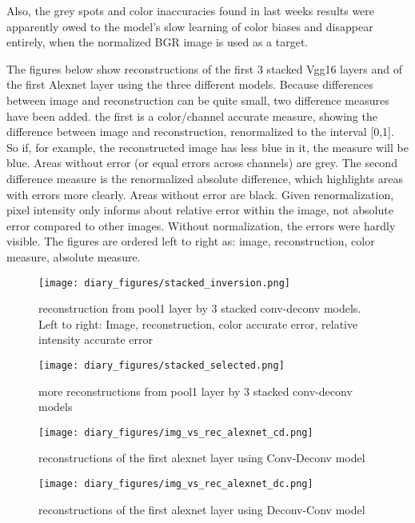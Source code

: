 \documentclass{article}
\begin{document}
Also, the grey spots and color inaccuracies found in last weeks results were apparently owed to the model's slow learning of color biases and disappear entirely, when the normalized BGR image is used as a target.

The figures below show reconstructions of the first 3 stacked Vgg16 layers and of the first Alexnet layer using the three different models. Because differences between image and reconstruction can be quite small, two difference measures have been added. the first is a color/channel accurate measure, showing the difference between image and reconstruction, renormalized to the interval [0,1]. So if, for example, the reconstructed image has less blue in it, the measure will be blue. Areas without error (or equal errors across channels) are grey. The second difference measure is the renormalized absolute difference, which highlights areas with errors more clearly. Areas without error are black. Given renormalization,  pixel intensity only informs about relative error within the image, not absolute error compared to other images. Without normalization, the errors were hardly visible. The figures are ordered left to right as: image, reconstruction, color measure, absolute measure.

\begin{figure}
    \centering
    \texttt{[image: diary\_figures/stacked\_inversion.png]}
    \caption{reconstruction from pool1 layer by 3 stacked conv-deconv models. Left to right: Image, reconstruction, color accurate error, relative intensity accurate error}
    \label{fig:stacked_inv1}
\end{figure}

\begin{figure}
    \centering
    \texttt{[image: diary\_figures/stacked\_selected.png]}
    \caption{more reconstructions from pool1 layer by 3 stacked conv-deconv models}
    \label{fig:stacked_inv2}
\end{figure}

\begin{figure}
    \centering
    \texttt{[image: diary\_figures/img\_vs\_rec\_alexnet\_cd.png]}
    \caption{reconstructions of the first alexnet layer using Conv-Deconv model}
    \label{fig:alex_cd}
\end{figure}


\begin{figure}
    \centering
    \texttt{[image: diary\_figures/img\_vs\_rec\_alexnet\_dc.png]}
    \caption{reconstructions of the first alexnet layer using Deconv-Conv model}
    \label{fig:alex_dc}
\end{figure}
\end{document}
